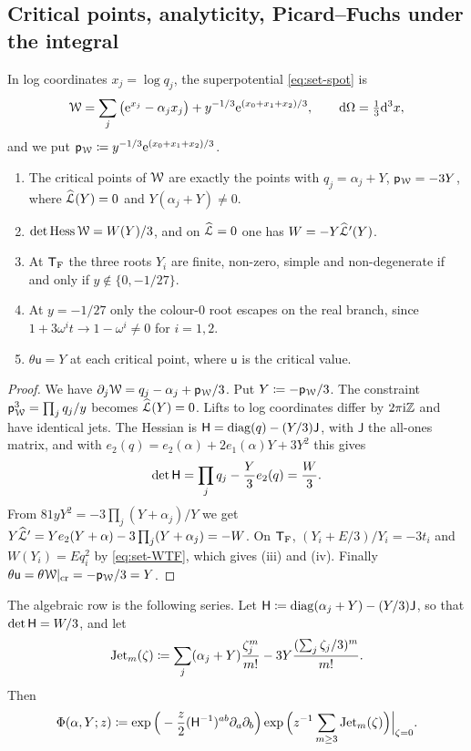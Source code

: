 \subsection{Critical points, analyticity, Picard--Fuchs under the integral}
\label{sec:row-crit}

In log coordinates $x_j=\log q_j$, the superpotential \eqref{eq:set-spot} is
\[
\mathcal{W}=\sum_j\big(\mathrm{e}^{x_j}-\alpha_jx_j\big)+y^{-1/3}\mathrm{e}^{(x_0+x_1+x_2)/3},\qquad\mathrm{d}\Omega=\tfrac13\mathrm{d}^3x,
\]
and we put $\mathsf{p}_{\mathcal{W}}\coloneqq y^{-1/3}\mathrm{e}^{(x_0+x_1+x_2)/3}$.

\begin{lem}
\label{lem:row-crit}
\begin{enumerate}
\item The critical points of $\mathcal{W}$ are exactly the points with $q_j=\alpha_j+Y$, $\mathsf{p}_{\mathcal{W}}=-3Y$, where $\widehat{\mathcal{L}}(Y)=0$ and $Y(\alpha_j+Y)\neq0$.
\item $\det\mathrm{Hess}\,\mathcal{W}=W(Y)/3$, and on $\widehat{\mathcal{L}}=0$ one has $W=-Y\widehat{\mathcal{L}}'(Y)$.
\item At $\mathsf{T}_{\mathrm{F}}$ the three roots $Y_i$ are finite, non-zero, simple and non-degenerate if and only if $y\notin\{0,-1/27\}$.
\item At $y=-1/27$ only the colour-$0$ root escapes on the real branch, since $1+3\omega^it\to1-\omega^i\neq0$ for $i=1,2$.
\item $\theta\mathsf{u}=Y$ at each critical point, where $\mathsf{u}$ is the critical value.
\end{enumerate}
\end{lem}

\begin{proof}
We have $\partial_j\mathcal{W}=q_j-\alpha_j+\mathsf{p}_{\mathcal{W}}/3$. Put $Y\coloneqq-\mathsf{p}_{\mathcal{W}}/3$. The constraint $\mathsf{p}_{\mathcal{W}}^3=\prod_jq_j/y$ becomes $\widehat{\mathcal{L}}(Y)=0$. Lifts to log coordinates differ by $2\pi\mathrm{i}\mathbb{Z}$ and have identical jets. The Hessian is $\mathsf{H}=\mathrm{diag}(q)-(Y/3)\mathsf{J}$, with $\mathsf{J}$ the all-ones matrix, and with $e_2(q)=e_2(\alpha)+2e_1(\alpha)Y+3Y^2$ this gives
\[
\det\mathsf{H}=\prod_jq_j-\frac Y3e_2(q)=\frac W3.
\]
From $81yY^2=-3\prod_j(Y+\alpha_j)/Y$ we get $Y\widehat{\mathcal{L}}'=Ye_2(Y+\alpha)-3\prod_j(Y+\alpha_j)=-W$. On $\mathsf{T}_{\mathrm{F}}$, $(Y_i+E/3)/Y_i=-3t_i$ and $W(Y_i)=Eq_i^2$ by \eqref{eq:set-WTF}, which gives (iii) and (iv). Finally $\theta\mathsf{u}=\theta\mathcal{W}|_{\mathrm{cr}}=-\mathsf{p}_{\mathcal{W}}/3=Y$.
\end{proof}

The algebraic row is the following series. Let $\mathsf{H}\coloneqq\mathrm{diag}(\alpha_j+Y)-(Y/3)\mathsf{J}$, so that $\det\mathsf{H}=W/3$, and let
\[
\mathrm{Jet}_m(\zeta)\coloneqq\sum_j(\alpha_j+Y)\frac{\zeta_j^m}{m!}-3Y\frac{(\sum_j\zeta_j/3)^m}{m!}.
\]
Then
\begin{equation}
\label{eq:row-Phi}
\Phi(\alpha,Y;z)\coloneqq\exp\Big(-\frac z2(\mathsf{H}^{-1})^{ab}\partial_a\partial_b\Big)\exp\Big(z^{-1}\sum_{m\geq3}\mathrm{Jet}_m(\zeta)\Big)\Big|_{\zeta=0}.
\end{equation}


